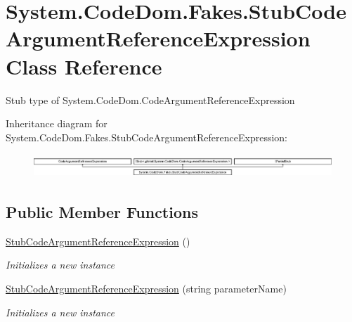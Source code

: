 \hypertarget{class_system_1_1_code_dom_1_1_fakes_1_1_stub_code_argument_reference_expression}{\section{System.\-Code\-Dom.\-Fakes.\-Stub\-Code\-Argument\-Reference\-Expression Class Reference}
\label{class_system_1_1_code_dom_1_1_fakes_1_1_stub_code_argument_reference_expression}
}


Stub type of System.\-Code\-Dom.\-Code\-Argument\-Reference\-Expression 


Inheritance diagram for System.\-Code\-Dom.\-Fakes.\-Stub\-Code\-Argument\-Reference\-Expression\-:\begin{figure}[H]
\begin{center}
\leavevmode
\includegraphics[height=0.893142cm]{class_system_1_1_code_dom_1_1_fakes_1_1_stub_code_argument_reference_expression}
\end{center}
\end{figure}
\subsection*{Public Member Functions}
\begin{DoxyCompactItemize}
\item 
\hyperlink{class_system_1_1_code_dom_1_1_fakes_1_1_stub_code_argument_reference_expression_a8eb790553ec79cbeefa99fb3f4f35f70}{Stub\-Code\-Argument\-Reference\-Expression} ()
\begin{DoxyCompactList}\small\item\em Initializes a new instance\end{DoxyCompactList}\item 
\hyperlink{class_system_1_1_code_dom_1_1_fakes_1_1_stub_code_argument_reference_expression_a4f71d7cf998cdcdacf4b14b2fcb1e8bc}{Stub\-Code\-Argument\-Reference\-Expression} (string parameter\-Name)
\begin{DoxyCompactList}\small\item\em Initializes a new instance\end{DoxyCompactList}\end{DoxyCompactItemize}
